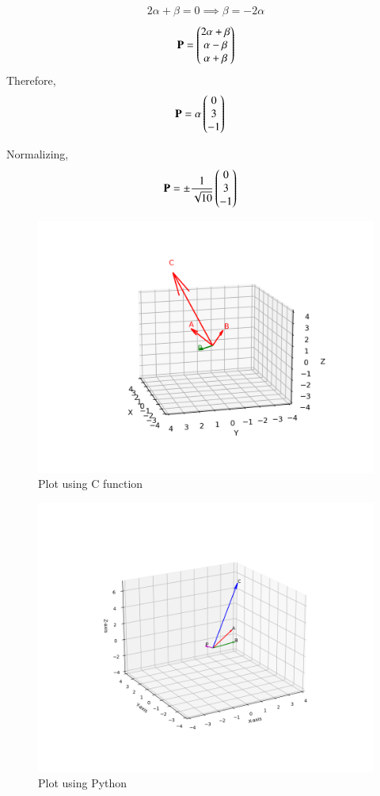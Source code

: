 \documentclass[journal,12pt,onecolumn]{IEEEtran}
\begin{document}
\begin{align}
 2\alpha+\beta = 0 \implies \beta = -2\alpha
\end{align}
\begin{align}
\mathbf{P}=\begin{pmatrix}2\alpha+\beta\\\alpha-\beta\\\alpha+\beta\end{pmatrix}
\end{align}
Therefore,
\begin{align}
\mathbf{P} &= \alpha\begin{pmatrix}0\\3\\-1\end{pmatrix}
\end{align}

Normalizing,
\begin{align}
\mathbf{P} &= \pm \frac{1}{\sqrt{10}} \begin{pmatrix}0\\3\\-1\end{pmatrix}
\end{align}
\begin{figure}[H]
	\centering
	\includegraphics[scale=0.5]{img}
	\caption*{Plot using C function}
	\label{img}
\end{figure}
\begin{figure}[H]
	\centering
	\includegraphics[scale=0.5]{fig}
	\caption*{Plot using Python}
	\label{fig}
\end{figure}
\end{document}

